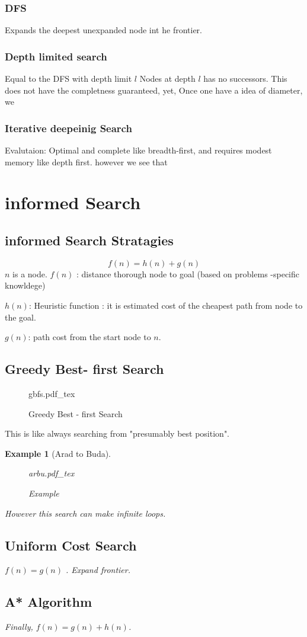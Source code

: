 \documentclass[12pt]{article}
\newtheorem*{example}{Example}
\begin{document}
\subsubsection{DFS}
Expands the deepest unexpanded node int he frontier.

\subsubsection{Depth limited search}
Equal to the DFS with depth limit $l$
Nodes at depth $l$ has no successors.
This does not have the completness guaranteed, yet, Once one have a idea of diameter, we


\subsubsection{Iterative deepeinig Search}
Evalutaion: Optimal and complete like breadth-first, and requires modest memory like depth first. however we see that


\section{informed Search}
\subsection{informed Search Stratagies}
\[
f(n) = h(n)+ g(n)
\]
$n$ is a node.
$f(n)$ : distance thorough node to goal (based on problems -specific knowldege)

$h(n)$: Heuristic function : it is estimated cost of the cheapest path from node to the goal.

$g(n)$: path cost from the start node to $n$.

\subsection{Greedy Best- first Search}

\begin{figure}[H]
	\centering
	\def\svgwidth{\columnwidth}
	{gbfs.pdf_tex}
	\caption{Greedy Best - first Search}
	\label{fig:gbfs}
\end{figure}

This is like always searching from "presumably best position".

\begin{example}[Arad to Buda]
\begin{figure}[H]
	\centering
	\def\svgwidth{\columnwidth}
	{arbu.pdf_tex}
	\caption{Example}
	\label{fig:arbu}
\end{figure}

However this search can make infinite loops.
\subsection{Uniform Cost Search}
$f(n) = g(n)$ . Expand frontier.

\subsection{A* Algorithm}
Finally, $f(n) = g(n) + h(n)$.

\end{example}
\end{document}
